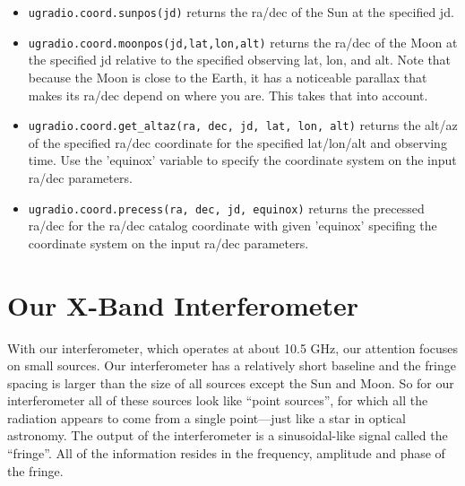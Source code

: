 \documentclass[11pt,preprint]{aastex}
\begin{document}
\begin{itemize}

\item \verb+ugradio.coord.sunpos(jd)+ returns the ra/dec of the Sun at the specified jd.

\item \verb+ugradio.coord.moonpos(jd,lat,lon,alt)+ returns the ra/dec of the Moon at
the specified jd relative to the specified observing lat, lon, and alt.
Note that because the Moon is close to the Earth, it has a noticeable
parallax that makes its ra/dec depend on where you are.  This takes that
into account.

\item \verb+ugradio.coord.get_altaz(ra, dec, jd, lat, lon, alt)+ returns the alt/az
of the specified ra/dec coordinate for the specified lat/lon/alt and
observing time.  Use the 'equinox' variable to specify the coordinate
system on the input ra/dec parameters.

\item \verb+ugradio.coord.precess(ra, dec, jd, equinox)+ returns the precessed ra/dec
for the ra/dec catalog coordinate with given 'equinox' specifing the coordinate
system on the input ra/dec parameters.



\end{itemize}

\section{Our X-Band Interferometer}

\noindent
With our interferometer, which operates at about 10.5 GHz, our
attention focuses on small sources.  Our interferometer has a relatively
short baseline and the fringe spacing is larger than the size of all
sources except the Sun and Moon.  So for our interferometer all of
these sources look like ``point sources'', for which all the radiation
appears to come from a single point---just like a star in optical
astronomy.  The output of the interferometer is a sinusoidal-like signal
called the ``fringe''. All of the information resides in the frequency,
amplitude and phase of the fringe.
\end{document}
